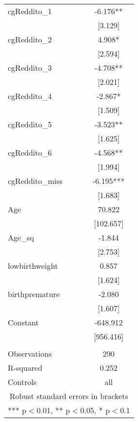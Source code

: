 \documentclass[]{article}
\begin{document}
\begin{tabular}{lc}
cgReddito\_1 & -6.176** \\
 & [3.129] \\
cgReddito\_2 & 4.908* \\
 & [2.594] \\
cgReddito\_3 & -4.708** \\
 & [2.021] \\
cgReddito\_4 & -2.867* \\
 & [1.509] \\
cgReddito\_5 & -3.523** \\
 & [1.625] \\
cgReddito\_6 & -4.568** \\
 & [1.994] \\
cgReddito\_miss & -6.195*** \\
 & [1.683] \\
Age & 70.822 \\
 & [102.657] \\
Age\_sq & -1.844 \\
 & [2.753] \\
lowbirthweight & 0.857 \\
 & [1.624] \\
birthpremature & -2.080 \\
 & [1.607] \\
Constant & -648.912 \\
 & [956.416] \\
 &  \\
Observations & 290 \\
R-squared & 0.252 \\
 Controls & all \\ \hline
\multicolumn{2}{c}{ Robust standard errors in brackets} \\
\multicolumn{2}{c}{ *** p$<$0.01, ** p$<$0.05, * p$<$0.1} \\
\end{tabular}
\end{document}
